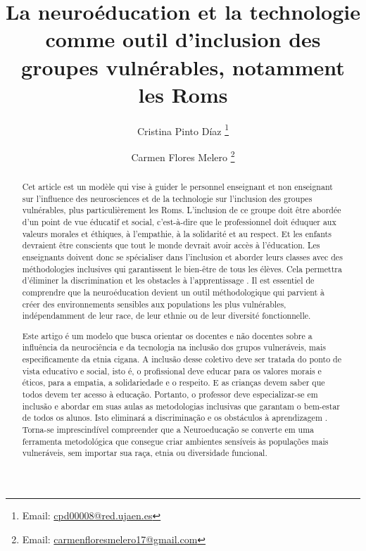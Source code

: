 \documentclass[french]{textolivre}
\title{La neuroéducation et la technologie comme outil d'inclusion des groupes vulnérables, notamment les Roms}
\author[1]{Cristina Pinto Díaz \orcid{0000-0003-0842-4003} \thanks{Email: \href{mailto:cpd00008@red.ujaen.es}{cpd00008@red.ujaen.es}}}
\author[1]{Carmen Flores Melero \orcid{0000-0002-7916-992X} \thanks{Email: \href{mailto:carmenfloresmelero17@gmail.com}{carmenfloresmelero17@gmail.com}}}
\affil[1]{Universidad de Jaén, Facultad de Humanidades y Ciencias de la Educación, Departamento Pedagogía, Jaén, España.}
\begin{document}
\maketitle

\begin{polyabstract}
\begin{abstract}
Cet article est un modèle qui vise à guider le personnel enseignant et non enseignant sur l'influence des neurosciences et de la technologie sur l'inclusion des groupes vulnérables, plus particulièrement les Roms. L'inclusion de ce groupe doit être abordée d'un point de vue éducatif et social, c'est-à-dire que le professionnel doit éduquer aux valeurs morales et éthiques, à l'empathie, à la solidarité et au respect. Et les enfants devraient être conscients que tout le monde devrait avoir accès à l'éducation. Les enseignants doivent donc se spécialiser dans l'inclusion et aborder leurs classes avec des méthodologies inclusives qui garantissent le bien-être de tous les élèves. Cela permettra d'éliminer la discrimination et les obstacles à l'apprentissage \cite{echeita_sarrionandia_pandemia_2020}. Il est essentiel de comprendre que la neuroéducation devient un outil méthodologique qui parvient à créer des environnements sensibles aux populations les plus vulnérables, indépendamment de leur race, de leur ethnie ou de leur diversité fonctionnelle.

\end{abstract}

\begin{portuguese}
\begin{abstract}
Este artigo é um modelo que busca orientar os docentes e não docentes sobre a influência da neurociência e da tecnologia na inclusão dos grupos vulneráveis, mais especificamente da etnia cigana. A inclusão desse coletivo deve ser tratada do ponto de vista educativo e social, isto é, o profissional deve educar para os valores morais e éticos, para a empatia, a solidariedade e o respeito. E as crianças devem saber que todos devem ter acesso à educação. Portanto, o professor deve especializar-se em inclusão e abordar em suas aulas as metodologias inclusivas que garantam o bem-estar de todos os alunos. Isto eliminará a discriminação e os obstáculos à aprendizagem \cite{echeita_sarrionandia_pandemia_2020}. Torna-se imprescindível compreender que a Neuroeducação se converte em uma ferramenta metodológica que consegue criar ambientes sensíveis às populações mais vulneráveis, sem importar sua raça, etnia ou diversidade funcional.


\end{abstract}
\end{portuguese}
\end{polyabstract}
\end{document}
